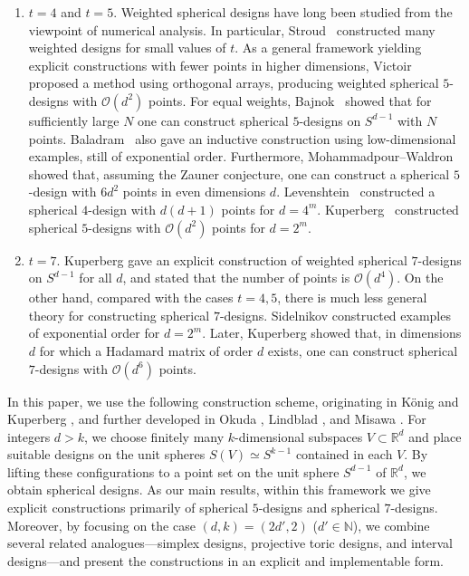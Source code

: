 \documentclass{amsart}
\theoremstyle{definition}
\theoremstyle{remark}
\numberwithin{equation}{section}
\newcommand{\R}{{\mathbb R}}
\newcommand{\N}{{\mathbb N}}
\newcommand{\order}{\mathcal{O}}
\begin{document}

\begin{enumerate}
    \item {$t=4$ and $t=5$.}
Weighted spherical designs have long been studied from the viewpoint of numerical analysis.
In particular, Stroud~\cite{Stroud1971} constructed many weighted designs for small values of $t$.
As a general framework yielding explicit constructions with fewer points in higher dimensions,
Victoir~\cite{Victoir2004} proposed a method using orthogonal arrays, producing weighted spherical $5$-designs with $\order(d^2)$ points.
For equal weights, Bajnok~\cite{Bajnok1991-1} showed that for sufficiently large $N$ one can construct spherical $5$-designs on $S^{d-1}$ with $N$ points.
Baladram~\cite{Baladram-phd} also gave an inductive construction using low-dimensional examples, still of exponential order.
Furthermore, Mohammadpour--Waldron~\cite{MW2013} showed that, assuming the Zauner conjecture, one can construct a spherical $5$-design with $6d^2$ points in even dimensions $d$.
Levenshtein~\cite{Levenshtein1982} constructed a spherical $4$-design with $d(d+1)$ points for $d=4^m$.
Kuperberg~\cite{Kuperberg2006} constructed spherical $5$-designs with $\order(d^2)$ points for $d=2^m$.


    \item{$t=7$.}
Kuperberg \cite{Kuperberg2006HatBox} gave an explicit construction of weighted spherical $7$-designs on $S^{d-1}$ for all $d$, and stated that the number of points is $\order(d^4)$.
On the other hand, compared with the cases $t=4,5$, there is much less general theory for constructing spherical $7$-designs.
Sidelnikov \cite{Sidelnikov1999} constructed examples of exponential order for $d=2^m$.
Later, Kuperberg \cite{Kuperberg2006HatBox} showed that, in dimensions $d$ for which a Hadamard matrix of order $d$ exists, one can construct spherical $7$-designs with $\order(d^6)$ points.
\end{enumerate}

In this paper, we use the following construction scheme, originating in K\"onig \cite{Koenig1999} and Kuperberg \cite{Kuperberg2006}, and further developed in Okuda \cite{Okuda2015}, Lindblad \cite{Lindblad2023}, and Misawa \cite{Misawa2026}.
For integers $d>k$, we choose finitely many $k$-dimensional subspaces $V\subset\R^d$ and place suitable designs on the unit spheres $S(V)\simeq S^{k-1}$ contained in each $V$.
By lifting these configurations to a point set on the unit sphere $S^{d-1}$ of $\R^d$, we obtain spherical designs.
As our main results, within this framework we give explicit constructions primarily of spherical $5$-designs and spherical $7$-designs.
Moreover, by focusing on the case $(d,k)=(2d',2)$ ($d'\in\N$), we combine several related analogues—simplex designs, projective toric designs, and interval designs—and present the constructions in an explicit and implementable form.
\end{document}
